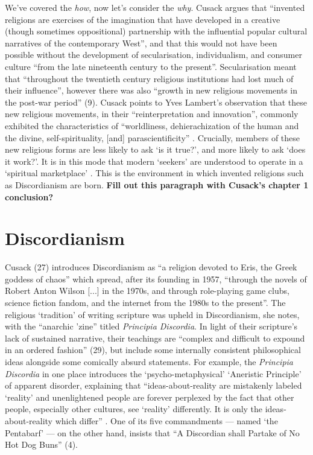 \documentclass[Draft.tex]{subfiles}
\begin{document}
We've covered the \textit{how}, now let's consider the \textit{why}.
Cusack \parencite*[7]{Cusack10} argues that ``invented religions are
exercises of the imagination that have developed in a creative
(though sometimes oppositional) partnership with the influential
popular cultural narratives of the contemporary West'',
and that this would not have been possible without
the development of secularisation, individualism, and consumer culture
``from the late nineteenth century to the present''.
Secularisation meant that  ``throughout the twentieth century
religious institutions had lost much of their influence'',
however there was also ``growth in new religious movements
in the post-war period'' (9).
Cusack \parencite[9]{Cusack10} points to Yves Lambert's observation that
these new religious movements, in their ``reinterpretation and innovation'', 
commonly exhibited the characteristics of
``worldliness, dehierachization of the human and the divine,
self-spirituality, [and] parascientificity'' \parencite[303]{Lambert99}.
Crucially, members of these new religious forms are less likely to ask
`is it true?', and more likely to ask `does it work?'.
It is in this mode that modern `seekers' are understood to operate in
a `spiritual marketplace' \parencite[13]{Cusack10}.
This is the environment in which invented religions 
such as Discordianism are born.
\textbf{Fill out this paragraph with Cusack's chapter 1 conclusion?}

\section*{Discordianism}
Cusack (27) introduces Discordianism as 
``a religion devoted to Eris, the Greek goddess of chaos''
which spread, after its founding in 1957, ``through
the novels of Robert Anton Wilson [...] in the 1970s,
and through role-playing game clubs, science fiction fandom,
and the internet from the 1980s to the present''.
The religious `tradition' of writing scripture was upheld in Discordianism,
she notes, with the ``anarchic 'zine'' titled \textit{Principia Discordia}.
In light of their scripture's lack of sustained narrative, their teachings 
are ``complex and difficult to expound in an ordered fashion'' (29),
but include some internally consistent philosophical ideas
alongside some comically absurd statements.
For example, the \textit{Principia Discordia} in one place introduces the
`psycho-metaphysical' `Aneristic Principle' of apparent disorder,
explaining that ``ideas-about-reality are mistakenly labeled `reality'
and unenlightened people are forever perplexed by the fact that
other people, especially other cultures, see `reality' differently.
It is only the ideas-about-reality which differ'' \parencite[49]{Principia}.
One of its five commandments --- named `the Pentabarf' --- on the other hand,
insists that ``A Discordian shall Partake of No Hot Dog Buns'' (4).
\end{document}
